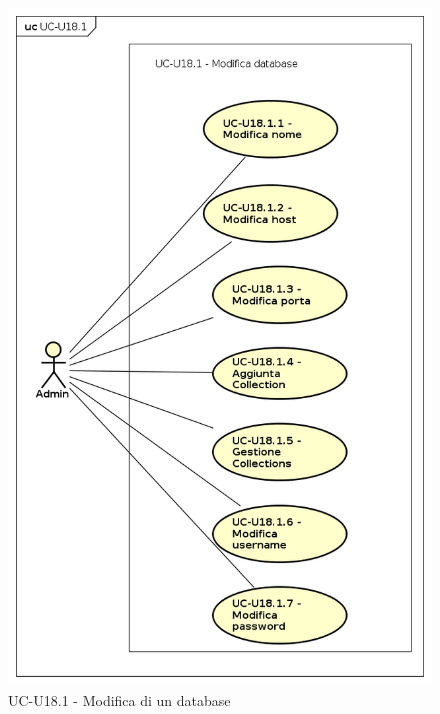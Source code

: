     \begin{figure}[H]
      \begin{center}
        \includegraphics[height=18cm]{res/img/UCUtenti/UCUtenteA/UC-U18-OperazioniDatabase/UC-U18.1-ModificaDatabase.png}
      \caption{UC-U18.1 - Modifica di un database}
      \end{center} 
    \end{figure}    
    
